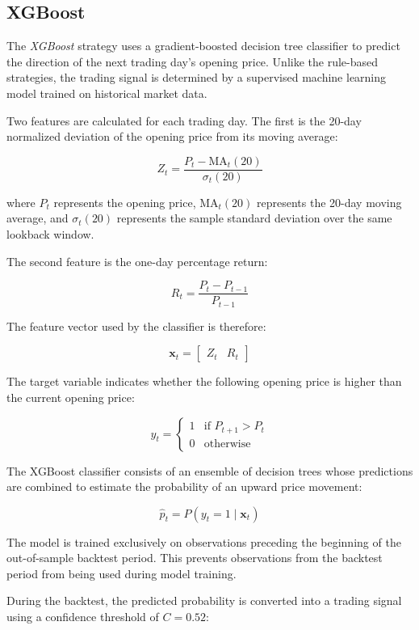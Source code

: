 \documentclass{article}
\begin{document}
\subsection{XGBoost}

The \textit{XGBoost} strategy uses a gradient-boosted decision tree classifier to predict the direction of the next trading day's opening price. Unlike the rule-based strategies, the trading signal is determined by a supervised machine learning model trained on historical market data.

Two features are calculated for each trading day. The first is the 20-day normalized deviation of the opening price from its moving average:

\[
Z_t =
\frac{P_t - \text{MA}_t(20)}
{\sigma_t(20)}
\]

where $P_t$ represents the opening price, $\text{MA}_t(20)$ represents the 20-day moving average, and $\sigma_t(20)$ represents the sample standard deviation over the same lookback window.

The second feature is the one-day percentage return:

\[
R_t =
\frac{P_t - P_{t-1}}
{P_{t-1}}
\]

The feature vector used by the classifier is therefore:

\[
\mathbf{x}_t =
\begin{bmatrix}
Z_t & R_t
\end{bmatrix}
\]

The target variable indicates whether the following opening price is higher than the current opening price:

\[
y_t =
\begin{cases}
1 & \text{if } P_{t+1} > P_t \\
0 & \text{otherwise}
\end{cases}
\]

The XGBoost classifier consists of an ensemble of decision trees whose predictions are combined to estimate the probability of an upward price movement:

\[
\hat{p}_t =
P(y_t = 1 \mid \mathbf{x}_t)
\]

The model is trained exclusively on observations preceding the beginning of the out-of-sample backtest period. This prevents observations from the backtest period from being used during model training.

During the backtest, the predicted probability is converted into a trading signal using a confidence threshold of $C = 0.52$:
\end{document}
